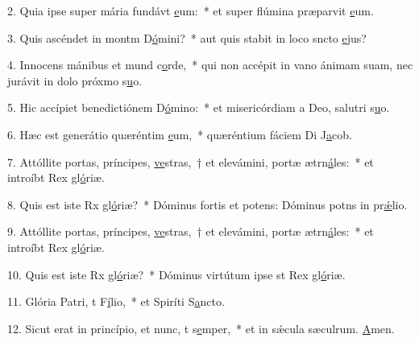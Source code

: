 2. Quia ipse super mária fundávt \uline{e}um:~* et super flúmina præparvit \uline{e}um.\par 
3. Quis ascéndet in montm D\uline{ó}mini?~* aut quis stabit in loco sncto \uline{e}jus?\par 
4. Innocens mánibus et mund c\uline{o}rde,~* qui non accépit in vano ánimam suam, nec jurávit in dolo próxmo s\uline{u}o.\par 
5. Hic accípiet benedictiónem  D\uline{ó}mino:~* et misericórdiam a Deo, salutri s\uline{u}o.\par 
6. Hæc est generátio quæréntim \uline{e}um,~* quæréntium fáciem Di J\uline{a}cob.\par 
7. Attóllite portas, príncipes, \uline{ve}stras,~† et elevámini, portæ ætrn\uline{á}les:~* et introíbt Rex gl\uline{ó}riæ.\par 
8. Quis est iste Rx gl\uline{ó}riæ?~* Dóminus fortis et potens: Dóminus potns in pr\uline{ǽ}lio.\par 
9. Attóllite portas, príncipes, \uline{ve}stras,~† et elevámini, portæ ætrn\uline{á}les:~* et introíbt Rex gl\uline{ó}riæ.\par 
10. Quis est iste Rx gl\uline{ó}riæ?~* Dóminus virtútum ipse st Rex gl\uline{ó}riæ.\par 
11. Glória Patri, t F\uline{í}lio,~* et Spiríti S\uline{a}ncto.\par 
12. Sicut erat in princípio, et nunc, t s\uline{e}mper,~* et in sǽcula sæculrum. \uline{A}men.\par 
